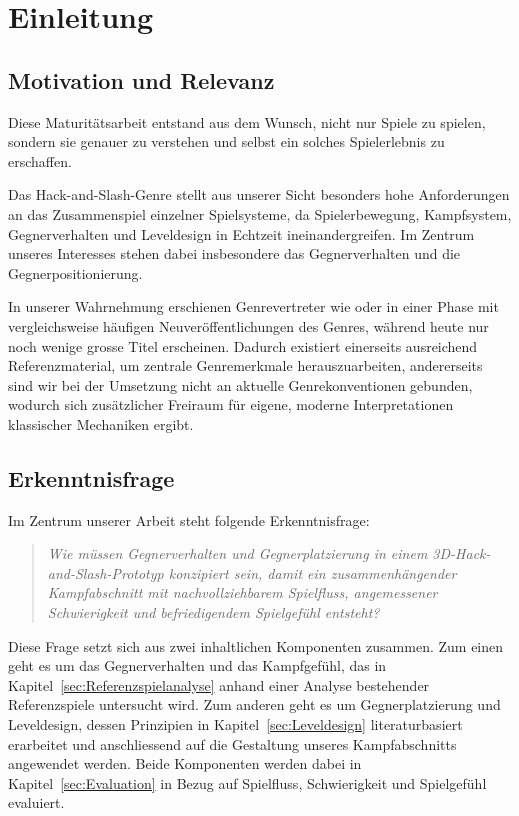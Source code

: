 \documentclass[../Main.tex]{subfiles}
\begin{document}
\section{Einleitung}

\subsection{Motivation und Relevanz}

Diese Maturitätsarbeit entstand aus dem Wunsch, nicht nur Spiele zu spielen, sondern sie genauer zu verstehen und selbst ein solches Spielerlebnis zu erschaffen.

Das Hack-and-Slash-Genre stellt aus unserer Sicht besonders hohe Anforderungen an das Zusammenspiel einzelner Spielsysteme, da Spielerbewegung, Kampfsystem, Gegnerverhalten und Leveldesign in Echtzeit ineinandergreifen. Im Zentrum unseres Interesses stehen dabei insbesondere das Gegnerverhalten und die Gegnerpositionierung.

In unserer Wahrnehmung erschienen Genrevertreter wie  oder  in einer Phase mit vergleichsweise häufigen Neuveröffentlichungen des Genres, während heute nur noch wenige grosse Titel erscheinen. Dadurch existiert einerseits ausreichend Referenzmaterial, um zentrale Genremerkmale herauszuarbeiten, andererseits sind wir bei der Umsetzung nicht an aktuelle Genrekonventionen gebunden, wodurch sich zusätzlicher Freiraum für eigene, moderne Interpretationen klassischer Mechaniken ergibt.

\subsection{Erkenntnisfrage} \label{sec:Erkenntnisfrage}

Im Zentrum unserer Arbeit steht folgende Erkenntnisfrage:

\vspace{\baselineskip}

\begin{quote}
\textit{Wie müssen Gegnerverhalten und Gegnerplatzierung in einem 3D-Hack-and-Slash-Prototyp konzipiert sein, damit ein zusammenhängender Kampfabschnitt mit nachvollziehbarem Spielfluss, angemessener Schwierigkeit und befriedigendem Spielgefühl entsteht?}
\end{quote}

\vspace{\baselineskip}

Diese Frage setzt sich aus zwei inhaltlichen Komponenten zusammen. Zum einen geht es um das Gegnerverhalten und das Kampfgefühl, das in Kapitel~\ref{sec:Referenzspielanalyse} anhand einer Analyse bestehender Referenzspiele untersucht wird. Zum anderen geht es um Gegnerplatzierung und Leveldesign, dessen Prinzipien in Kapitel~\ref{sec:Leveldesign} literaturbasiert erarbeitet und anschliessend auf die Gestaltung unseres Kampfabschnitts angewendet werden. Beide Komponenten werden dabei in Kapitel~\ref{sec:Evaluation} in Bezug auf Spielfluss, Schwierigkeit und Spielgefühl evaluiert.
\end{document}
